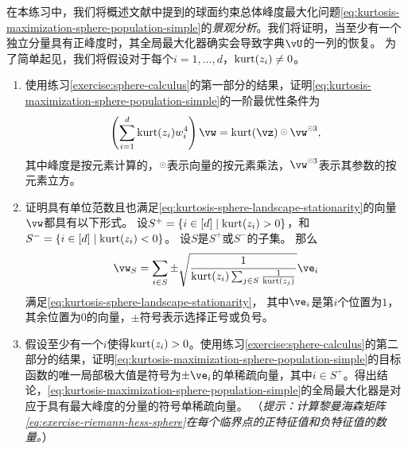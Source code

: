 \documentclass[../../book-main_zh.tex]{subfiles}
\begin{document}
\begin{exercise}\label{exercise:kurtosis-sphere-landscape}
    在本练习中，我们将概述文献中提到的球面约束总体峰度最大化问题\eqref{eq:kurtosis-maximization-sphere-population-simple}的\textit{景观分析}。我们将证明，当至少有一个独立分量具有正峰度时，其全局最大化器确实会导致字典$\vU$的一列的恢复。
    为了简单起见，我们将假设对于每个$i = 1, \dots, d$，$\mathop{\mathrm{kurt}}(z_i) \neq 0$。
    \begin{enumerate}
        \item 使用练习\ref{exercise:sphere-calculus}的第一部分的结果，证明\eqref{eq:kurtosis-maximization-sphere-population-simple}的一阶最优性条件为
        \begin{equation}\label{eq:kurtosis-sphere-landscape-stationarity}
            \left(\sum_{i=1}^d \kurt(z_i) w_i^4 \right) 
            \vw = \kurt(\vz) \hada \vw^{\hada 3}, 
        \end{equation}
        其中峰度是按元素计算的，$\hada$表示向量的按元素乘法，$\vw^{\hada 3}$表示其参数的按元素立方。
        \item 证明具有单位范数且也满足\eqref{eq:kurtosis-sphere-landscape-stationarity}的向量$\vw$都具有以下形式。
        设$S^+ = \set{i \in [d] \given \kurt(z_i) > 0}$，和
        $S^- = \set{i \in [d] \given \kurt(z_i) < 0}$。
        设$S$是$S^+$或$S^-$的子集。
        那么
        \begin{equation}\label{eq:kurtosis-sphere-landscape-cps}
            \vw_S = \sum_{i \in S} \pm \sqrt{\frac{1}{\kurt(z_i) \sum_{j \in S} \frac{1}{\kurt(z_j)}}} \ve_i
        \end{equation}
        满足\eqref{eq:kurtosis-sphere-landscape-stationarity}，
        其中$\ve_i$是第$i$个位置为$1$，其余位置为$0$的向量，$\pm$符号表示选择正号或负号。
        \item 假设至少有一个$i$使得$\mathop{\mathrm{kurt}}(z_i) > 0$。使用练习\ref{exercise:sphere-calculus}的第二部分的结果，证明\eqref{eq:kurtosis-maximization-sphere-population-simple}的目标函数的唯一局部极大值是符号为$\pm \ve_i$的单稀疏向量，其中$i \in S^+$。得出结论，\eqref{eq:kurtosis-maximization-sphere-population-simple}的全局最大化器是对应于具有最大峰度的分量的符号单稀疏向量。%
        （\textit{提示：计算黎曼海森矩阵\eqref{eq:exercise-riemann-hess-sphere}在每个临界点的正特征值和负特征值的数量。}）

\end{enumerate}
\end{exercise}
\end{document}
